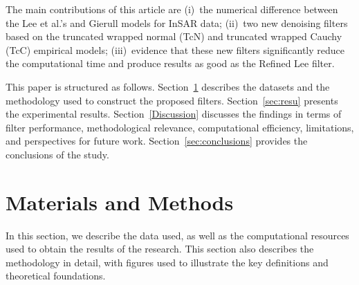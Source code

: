 \documentclass[remotesensing,article,submit,pdftex,moreauthors]{Definitions/mdpi}
\begin{document}

The main contributions of this article are 
(i)~the numerical 	difference between the Lee et al.'s and Gierull models for InSAR data; 
(ii)~two new denoising filters based on the truncated wrapped normal (TcN) and truncated wrapped Cauchy (TcC) empirical models; 
(iii)~evidence that these new filters significantly reduce the computational time and  produce results as good as the Refined Lee filter. 



This paper is structured as follows.
Section~\ref{sec:mat_meth} describes the datasets and the methodology used to construct the proposed filters.
Section~\ref{sec:resu} presents the experimental results.
Section~\ref{Discussion} discusses the findings in terms of filter performance, methodological relevance, computational efficiency, limitations, and perspectives for future work.
Section~\ref{sec:conclusions} provides the conclusions of the study.

\section{Materials and Methods}\label{sec:mat_meth}

In this section, we describe the data used, as well as the computational resources used to obtain the results of the research. 
This section also describes the methodology in detail, with figures used to illustrate the key definitions and theoretical foundations.

%
\end{document}

